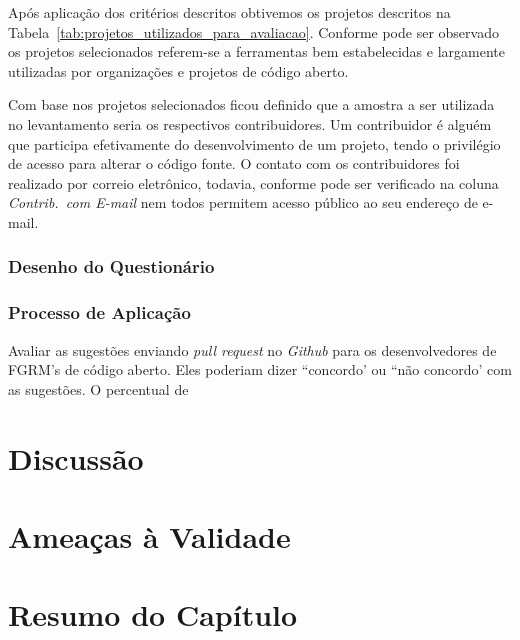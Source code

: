 Após aplicação dos critérios descritos obtivemos os projetos descritos na
Tabela~\ref{tab:projetos_utilizados_para_avaliacao}. Conforme pode ser observado
os projetos selecionados referem-se a ferramentas bem estabelecidas e largamente
utilizadas por organizações e projetos de código aberto.

\begin{table}[htpb]
\centering
{}
\caption{Projetos Analisados. Os dados apresentados tem como referência
	07/03/2017.}
\label{tab:projetos_utilizados_para_avaliacao}
\end{table}


Com base nos projetos selecionados ficou definido que a amostra a ser utilizada
no levantamento seria os respectivos contribuidores. Um contribuidor é alguém
que participa efetivamente do desenvolvimento de um projeto, tendo o privilégio
de acesso para alterar o código fonte. O contato com os contribuidores foi
realizado por correio eletrônico, todavia, conforme pode ser verificado na
coluna \textit{Contrib.\ com E-mail} nem todos permitem acesso público ao seu
endereço de e-mail.

\subsubsection{Desenho do Questionário}
\label{ssub:sug_melhoria_desenho_questionario}


\subsubsection{Processo de Aplicação}
\label{ssub:processo_de_aplicação}







Avaliar as sugestões enviando \textit{pull request} no \textit{Github} para os
desenvolvedores de FGRM's de código aberto. Eles poderiam dizer ``concordo' ou
``não concordo' com as sugestões. O percentual de

\section{Discussão}
\label{sec:sug_melhoria_discussao}

\section{Ameaças à Validade}
\label{sec:sug_melhoria_ameacas}

\section{Resumo do Capítulo}
\label{sec:sug_melhoria_resumo}
